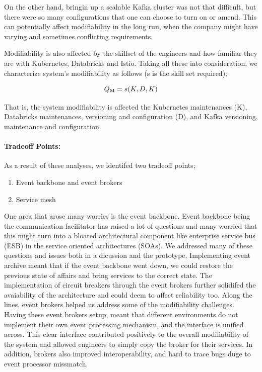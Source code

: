 \documentclass{bmcart}
\begin{document}
On the other hand, bringin up a scalable Kafka cluster was not that difficult, but there were so many configurations that one can choose to turn on or amend. This can potentially affect modifiability in the long run, when the company might have varying and sometimes conflicting requirements.

Modifiability is also affected by the skillset of the engineers and how familiar they are with Kubernetes, Databricks and Istio. Taking all these into consideration, we characterize system's modifiability as follows (s is the skill set required);

\begin{equation}
    Q\textsubscript{M} = s(K, D, K)
\end{equation}

That is, the system modifiability is affected the Kubernetes maintenances (K), Databricks maintenances, versioning and configuration (D), and Kafka versioning, maintenance and configuration.


\paragraph{Tradeoff Points:}

As a result of these analyses, we identifed two tradeoff points;

\begin{enumerate}
    \item Event backbone and event brokers
    \item Service mesh
\end{enumerate}

One area that arose many worries is the event backbone. Event backbone being the communication facilitator has raised a lot of questions and many worried that this might turn into a bloated architectural component like enterprise service bus (ESB) in the service oriented architectures (SOAs). We addressed many of these questions and issues both in a dicussion and the prototype. Implementing event archive meant that if the event backbone went down, we could restore the previous state of affairs and bring services to the correct state. The implementation of circuit breakers through the event brokers further solidifed the avaiability of the architecture and could deem to affect reliability too. Along the lines, event brokers helped us address some of the modifiability challenges. Having these event brokers setup, meant that different environments do not implement their own event processing mechanism, and the interface is unified across. This clear interface contributed positively to the overall modifiability of the system and allowed engineers to simply copy the broker for their services. In addition, brokers also improved interoperability, and hard to trace bugs duge to event processor missmatch.
\end{document}
